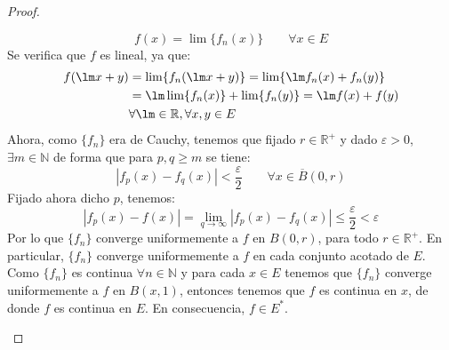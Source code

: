 \begin{prop}
\begin{proof}
\begin{enumerate}
                \begin{equation*}
                    f(x) = \lim \{f_n(x)\} \qquad \forall x\in E
                \end{equation*}
                Se verifica que $f$ es lineal, ya que:
                \begin{align*}
                    f(\lm x + y) &= \lim \{f_n(\lm x + y)\} = \lim \{\lm f_n(x)  + f_n(y)\} \\ &= \lm \lim\{f_n(x)\} +  \lim\{f_n(y)\} = \lm f(x) + f(y) \\
                                 & \forall \lm \in \mathbb{R}, \forall x,y\in E
                \end{align*}
                Ahora, como $\{f_n\}$ era de Cauchy, tenemos que fijado $r\in \mathbb{R}^+$ y dado $\varepsilon>0$, $\exists m\in \mathbb{N}$ de forma que para $p,q\geq m$ se tiene:
                \begin{equation*}
                    |f_p(x) - f_q(x)| < \dfrac{\varepsilon}{2} \qquad \forall x\in \overline{B}(0,r)
                \end{equation*}
                Fijado ahora dicho $p$, tenemos:
                \begin{equation*}
                    |f_p(x) - f(x)| = \lim_{q\to \infty} |f_p(x) - f_q(x)| \leq \dfrac{\varepsilon}{2} < \varepsilon
                \end{equation*}
                Por lo que $\{f_n\}$ converge uniformemente a $f$ en $B(0,r)$, para todo $r\in \mathbb{R}^+$. En particular, $\{f_n\}$ converge uniformemente a $f$ en cada conjunto acotado de $E$. Como $\{f_n\}$  es continua $\forall n\in \mathbb{N}$ y para cada $x\in E$ tenemos que $\{f_n\}$ converge uniformemente a $f$ en $B(x,1)$, entonces tenemos que $f $ es continua en $x$, de donde $f$ es continua en $E$. En consecuencia, $f\in E^\ast$.


\end{enumerate}
\end{proof}
\end{prop}
